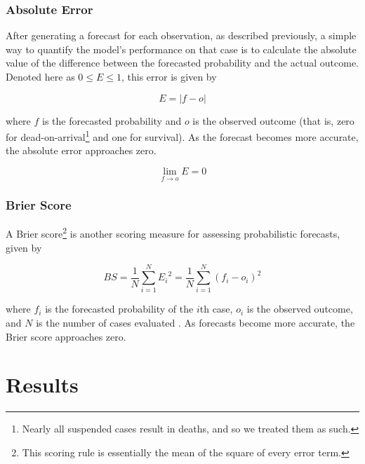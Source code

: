 \documentclass[12pt,titlepage]{article}
\begin{document}

      \subsubsection{Absolute Error}
        After generating a forecast for each observation, as described
        previously, a simple way to quantify the model's performance on that
        case is to calculate the absolute value of the difference between the
        forecasted probability and the actual outcome. Denoted here as $0 \leq
        E \leq 1$, this error is given by

        $$E = |f - o|$$

        where $f$ is the forecasted probability and $o$ is the observed outcome
        (that is, zero for dead-on-arrival\footnote{Nearly all suspended cases
        result in deaths, and so we treated them as such.} and one for
        survival). As the forecast becomes more accurate, the absolute error
        approaches zero.

        $$\lim_{f \to o} E = 0$$

      \vfill

      \subsubsection{Brier Score}
        A Brier score\footnote{This scoring rule is essentially the mean of
        the square of every error term.} is another scoring measure for
        assessing probabilistic forecasts, given by

        $$BS = \frac{1}{N} \sum_{i=1}^N {E_i}^2 = \frac{1}{N}
          \sum_{i=1}^N (f_i - o_i)^2$$

        where $f_i$ is the forecasted probability of the $i$th case, $o_i$ is
        the observed outcome, and $N$ is the number of cases evaluated
        \cite{brier+score}. As forecasts become more accurate, the Brier score
        approaches zero.

  \section{Results}


    
\end{document}
